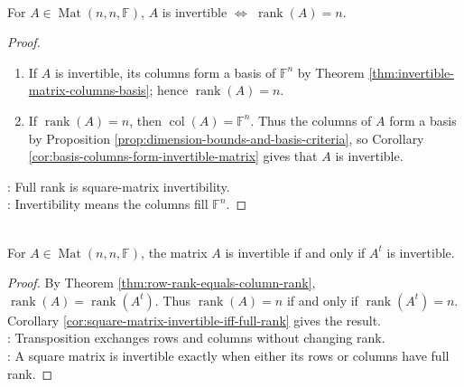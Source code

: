 \begin{corollary} \label{cor:square-matrix-invertible-iff-full-rank} \\
For $A\in\operatorname{Mat}(n,n,\mathbb{F})$, $A$ is invertible $\Longleftrightarrow$ $\operatorname{rank}(A)=n$.
\begin{proof}
\begin{enumerate}[label=\roman*.]
\setlength{\itemsep}{0pt}
\item[$(\Rightarrow)$] If $A$ is invertible, its columns form a basis of $\mathbb{F}^n$ by Theorem \ref{thm:invertible-matrix-columns-basis}; hence $\operatorname{rank}(A)=n$.
\item[$(\Leftarrow)$] If $\operatorname{rank}(A)=n$, then $\operatorname{col}(A)=\mathbb{F}^n$. Thus the columns of $A$ form a basis by Proposition \ref{prop:dimension-bounds-and-basis-criteria}, so Corollary \ref{cor:basis-columns-form-invertible-matrix} gives that $A$ is invertible.
\end{enumerate}
: Full rank is square-matrix invertibility.\\
: Invertibility means the columns fill $\mathbb{F}^n$.
\end{proof}
\end{corollary}

\begin{corollary} \label{cor:transpose-invertible-iff} \\
For $A\in\operatorname{Mat}(n,n,\mathbb{F})$, the matrix $A$ is invertible if and only if $A^t$ is invertible.
\begin{proof}
By Theorem \ref{thm:row-rank-equals-column-rank}, $\operatorname{rank}(A)=\operatorname{rank}(A^t)$. Thus $\operatorname{rank}(A)=n$ if and only if $\operatorname{rank}(A^t)=n$.\\
Corollary \ref{cor:square-matrix-invertible-iff-full-rank} gives the result.\\
: Transposition exchanges rows and columns without changing rank.\\
: A square matrix is invertible exactly when either its rows or columns have full rank.
\end{proof}
\end{corollary}


